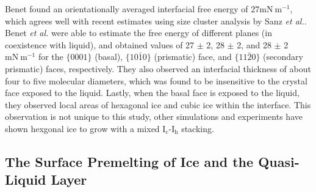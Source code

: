
Benet found an orientationally averaged interfacial free energy of
$27 \mathrm{mN}~\mathrm{m}^{-1}$, which agrees well with recent
estimates using size cluster analysis by Sanz \textit{et
  al.}\cite{Sanz2013}. Benet \textit{et al.} were able to estimate the
free energy of different planes (in coexistence with liquid), and
obtained values of 27 $\pm$ 2, 28 $\pm$ 2, and 28 $\pm$ 2
$\mathrm{mN}~\mathrm{m}^{-1}$ for the $\{0001\}$ (basal),
$\{10\bar{1}0\}$ (prismatic) face, and $\{11\bar{2}0\}$ (secondary
prismatic) faces, respectively. They also observed an interfacial
thickness of about four to five molecular diameters, which was found
to be insensitive to the crystal face exposed to the liquid. Lastly,
when the basal face is exposed to the liquid, they observed local
areas of hexagonal ice and cubic ice within the interface. This
observation is not unique to this study, other simulations and
experiments have shown hexgonal ice to grow with a mixed
I$_\mathrm{c}$-I$_\mathrm{h}$ stacking.\cite{43-47}



\subsection{The Surface Premelting of Ice and the Quasi-Liquid Layer}

